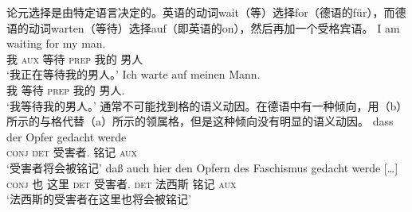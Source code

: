 \begin{exe}
\begin{xlist}[iv.]
\begin{exe}
\begin{xlist}[iv.]
论元选择是由特定语言决定的。英语的动词wait（等）选择for（德语的für），而德语的动词warten（等待）选择auf（即英语的on），然后再加一个受格宾语。
\eal \label{loureed}
\ex 
\gll I am waiting for my man.\\
     我 \textsc{aux} 等待 \textsc{prep} 我的 男人\\
\glt `我正在等待我的男人。'
\ex 
\gll Ich warte auf meinen Mann.\\
     我   等待  \textsc{prep}  我的     男人.\acc\\
\glt `我等待我的男人。'
\zl
通常不可能找到格的语义动因。在德语中有一种倾向，用（b）所示的与格代替（a）所示的领属格，但是这种倾向没有明显的语义动因。
\eal
\ex 
\gll dass der Opfer gedacht werde\\
     \textsc{conj} \textsc{det} 受害者.\gen{} 铭记 \textsc{aux}\\
\glt `受害者将会被铭记'
\ex 
\gll daß auch hier den Opfern des Faschismus gedacht werde [\ldots]\footnotemark\\
     \textsc{conj} 也 这里 \textsc{det} 受害者.\dat{} \textsc{det} 法西斯 铭记 \textsc{aux}\\
\glt `法西斯的受害者在这里也将会被铭记'

\end{xlist}
\end{exe}
\end{xlist}
\end{exe}
